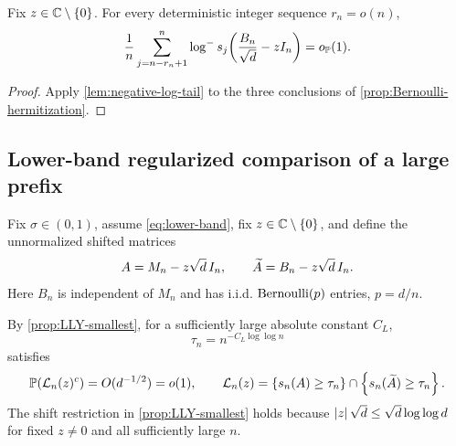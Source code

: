 \begin{corollary}\label{cor:Bernoulli-bottom-tail}
Fix $z\in\mathbb C\setminus\left\{0\right\}$. For every deterministic integer sequence $r_n=o(n)$,
\begin{equation}\label{eq:Bernoulli-bottom-tail}
  \frac1n\sum_{j=n-r_n+1}^n
  \log^{-} s_j\!\left(\frac{B_n}{\sqrt d}-zI_n\right)
  =o_{\mathbb P}(1).
\end{equation}
\end{corollary}

\begin{proof}
Apply \cref{lem:negative-log-tail} to the three conclusions of
\cref{prop:Bernoulli-hermitization}.
\end{proof}

\subsection{Lower-band regularized comparison of a large prefix}

Fix $\sigma\in(0,1)$, assume \eqref{eq:lower-band}, fix $z\in\mathbb C\setminus\left\{0\right\}$, and define the unnormalized shifted matrices
\begin{equation}\label{eq:shifted-comparators}
  A=M_n-z\sqrt d\,I_n,
  \qquad
  \widetilde A=B_n-z\sqrt d\,I_n.
\end{equation}
Here $B_n$ is independent of $M_n$ and has i.i.d. $\operatorname{Bernoulli}(p)$ entries, $p=d/n$.

By \cref{prop:LLY-smallest}, for a sufficiently large absolute constant $C_L$,
\begin{equation}\label{eq:lower-tau}
  \tau_n=n^{-C_L\log\log n}
\end{equation}
satisfies
\begin{equation}\label{eq:lower-good-event}
  \mathbb P(\mathcal L_n(z)^c)=O(d^{-1/2})=o(1),
  \qquad
  \mathcal L_n(z)=\left\{s_n(A)\ge\tau_n\right\}\cap\left\{s_n(\widetilde A)\ge\tau_n\right\}.
\end{equation}
The shift restriction in \cref{prop:LLY-smallest} holds because
$\left|z\right|\sqrt d\le\sqrt d\log\log d$ for fixed $z\ne0$ and all sufficiently large $n$.

